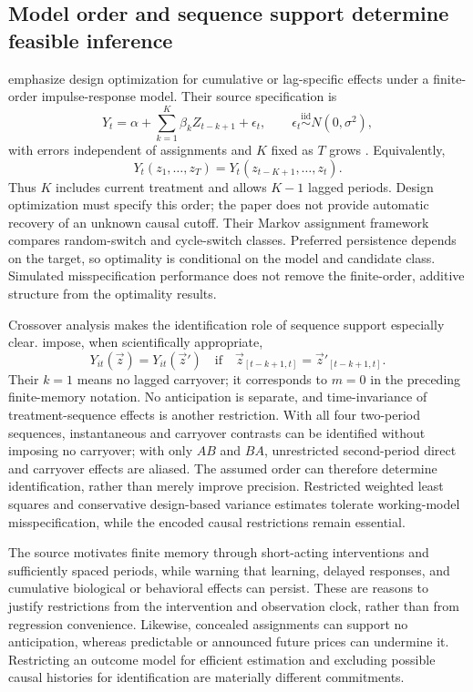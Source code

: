 \subsection{Model order and sequence support determine feasible inference}

\citet{guoliang2026} emphasize design optimization for cumulative or lag-specific effects under a finite-order impulse-response model. Their source specification is
\[
 Y_t=\alpha+\sum_{k=1}^K\beta_kZ_{t-k+1}+\epsilon_t,
 \qquad \epsilon_t\stackrel{\mathrm{iid}}{\sim}N(0,\sigma^2),
\]
with errors independent of assignments and $K$ fixed as $T$ grows \citep[Equation~(3.1), pp.~6--7]{guoliang2026}. Equivalently,
\[
 Y_t(z_1,\ldots,z_T)=Y_t(z_{t-K+1},\ldots,z_t).
\]
Thus $K$ includes current treatment and allows $K-1$ lagged periods. Design optimization must specify this order; the paper does not provide automatic recovery of an unknown causal cutoff. Their Markov assignment framework compares random-switch and cycle-switch classes. Preferred persistence depends on the target, so optimality is conditional on the model and candidate class. Simulated misspecification performance does not remove the finite-order, additive structure from the optimality results.

Crossover analysis makes the identification role of sequence support especially clear. \citet[Assumption~2, p.~6]{jiangding2025} impose, when scientifically appropriate,
\[
 Y_{it}(\vec z)=Y_{it}(\vec z')
 \quad\text{if}\quad
 \vec z_{[t-k+1,t]}=\vec z'_{[t-k+1,t]}.
\]
Their $k=1$ means no lagged carryover; it corresponds to $m=0$ in the preceding finite-memory notation. No anticipation is separate, and time-invariance of treatment-sequence effects is another restriction. With all four two-period sequences, instantaneous and carryover contrasts can be identified without imposing no carryover; with only $AB$ and $BA$, unrestricted second-period direct and carryover effects are aliased. The assumed order can therefore determine identification, rather than merely improve precision. Restricted weighted least squares and conservative design-based variance estimates tolerate working-model misspecification, while the encoded causal restrictions remain essential.

The source motivates finite memory through short-acting interventions and sufficiently spaced periods, while warning that learning, delayed responses, and cumulative biological or behavioral effects can persist. These are reasons to justify restrictions from the intervention and observation clock, rather than from regression convenience. Likewise, concealed assignments can support no anticipation, whereas predictable or announced future prices can undermine it. Restricting an outcome model for efficient estimation and excluding possible causal histories for identification are materially different commitments.

